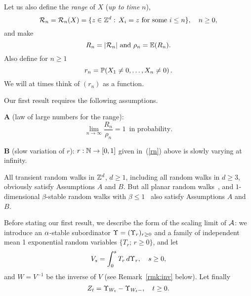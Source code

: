 Let us also define the {\em range} of $X$ ({\em up to time} $n$), 
\begin{equation}\label{eq:range}
\RR_n=\RR_n(X)=\{z\in\Z^d:\,X_i=z\mbox{ for some }i\leq n\},\quad n\geq0,
\end{equation}
and make 
\begin{equation}\label{eq:range1}
R_n=|\RR_n| \mbox{ and } \rho_n=\esp(R_n). 
\end{equation}
Also define for $n\geq1$
\begin{equation}\label{rn}
r_n=\P(X_1\ne0,\ldots,X_n\ne0)\,.
\end{equation}
We will at times think of $(r_n)$ as a function.

Our first result requires the following assumptions.

 $\mathbf A$ (law of large numbers for the range): 
\begin{equation}\label{llnr}
 \lim_{n\to\infty} \frac {R_n}{\rho_n}=1\,\mbox{ in probability}. 
\end{equation} 
	    

 $\mathbf B$ (slow variation of $r$): $r:{\mathbb N}\to[0,1]$ given in~(\ref{rn}) above
is slowly varying at infinity. \label{assb}


\begin{rmk}
 \label{rmk:lln}
All transient random walks in ${\mathbb Z}^d$, $d\geq1$, including all random walks in $d\geq3$, 
obviously satisfy Assumptions $A$ and $B$.
But all planar random walks~\cite{kn:JP1, kn:JP2}, and $1$-dimensional  $\beta$-stable 
random walks with  $\beta\leq1$~\cite{kn:LR} also satisfy Assumptions $A$ and $B$.
\end{rmk}


Before stating our first result, we describe the form of the scaling limit of ${\cal A}$: we introduce an $\alpha$-stable subordinator 
$\Upsilon=(\Upsilon_r)_{r\geq0}$ and a family of independent mean 1 exponential random variables $\{T_r;\,r\geq0\}$, and let 
\begin{equation}
\label{eq:V}
V_s=\int_0^sT_r\,d\ups_r,\quad s\geq0,
\end{equation}
and $W=V^{-1}$ be the inverse of $V$ (see Remark~\ref{rmk:inv} below). Let finally
\begin{equation}
\label{eq:Z}
Z_t=\ups_{W_t}-\ups_{W_t-},\quad t\geq0.
\end{equation}



